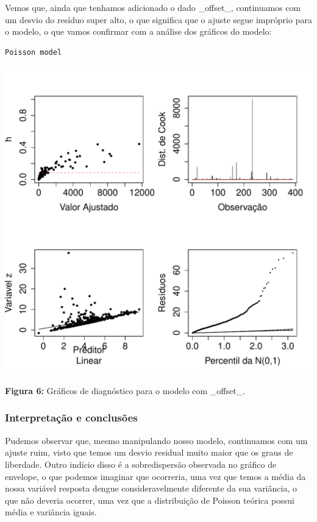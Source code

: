 \documentclass[12pt,a4paper]{article}\usepackage[]{graphicx}\usepackage[]{color}
\makeatletter
\def\maxwidth{ %
  \ifdim\Gin@nat@width>\linewidth
    \linewidth
  \else
    \Gin@nat@width
  \fi
}
\newenvironment{kframe}{%
 \def\at@end@of@kframe{}%
 \ifinner\ifhmode%
  \def\at@end@of@kframe{\end{minipage}}%
  \begin{minipage}{\columnwidth}%
 \fi\fi%
 \def\FrameCommand##1{\hskip\@totalleftmargin \hskip-\fboxsep
 \colorbox{shadecolor}{##1}\hskip-\fboxsep
     \hskip-\linewidth \hskip-\@totalleftmargin \hskip\columnwidth}%
 \MakeFramed {\advance\hsize-\width
   \@totalleftmargin\z@ \linewidth\hsize
   \@setminipage}}%
 {\par\unskip\endMakeFramed%
 \at@end@of@kframe}
\newenvironment{knitrout}{}{} %
\makeatother
\begin{document}
\newpage
Vemos que, ainda que tenhamos adicionado o dado \_offset\_, continuamos com um desvio do resíduo super alto, o que significa que o ajuste segue impróprio para o modelo, o que vamos confirmar com a análise dos gráficos do modelo:

\begin{knitrout}
\color{fgcolor}\begin{kframe}
\begin{verbatim}
Poisson model 
\end{verbatim}
\end{kframe}
\includegraphics[width=\maxwidth]{figure/unnamed-chunk-12-1} 

\end{knitrout}
\textbf{Figura 6:} Gráficos de diagnóstico para o modelo com \_offset\_.

\newpage
\subsubsection{\textbf{Interpretação e conclusões}}

Pudemos observar que, mesmo manipulando nosso modelo, continuamos com um ajuste ruim, visto que temos um desvio residual muito maior que os graus de liberdade. Outro indício disso é a sobredispersão observada no gráfico de envelope, o que podemos imaginar que ocorreria, uma vez que temos a média da nossa variável resposta dengue consideravelmente diferente da sua variância, o que não deveria ocorrer, uma vez que a distribuição de Poisson teórica possui média e variância iguais.
\end{document}
